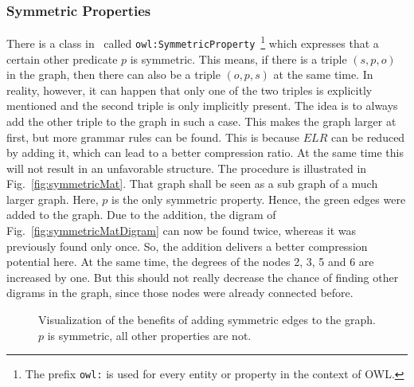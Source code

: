 \subsubsection{Symmetric Properties}


There is a class in~\cite{owl} called {\tt owl:SymmetricProperty}~\footnote{The prefix {\tt owl:} is used for every entity or property in the context of OWL.} which expresses that a certain other predicate $p$ is symmetric. This means, if there is a triple $(s,p,o)$ in the graph, then there can also be a triple $(o,p,s)$ at the same time. In reality, however, it can happen that only one of the two triples is explicitly mentioned and the second triple is only implicitly present. The idea is to always add the other triple to the graph in such a case. This makes the graph larger at first, but more grammar rules can be found. This is because $ELR$ can be reduced by adding it, which can lead to a better compression ratio. At the same time this will not result in an unfavorable structure. The procedure is illustrated in Fig.~\ref{fig:symmetricMat}. That graph shall be seen as a sub graph of a much larger graph. Here, $p$ is the only symmetric property. Hence, the green edges were added to the graph. Due to the addition, the digram of Fig.~\ref{fig:symmetricMatDigram} can now be found twice, whereas it was previously found only once. So, the addition delivers a better compression potential here. At the same time, the degrees of  the nodes 2, 3, 5 and 6 are increased by one. But this should not really decrease the chance of finding other digrams in the graph, since those nodes were already connected before.


\begin{figure}[h]
	\centering
	\hfill
	\caption{Visualization of the benefits of adding symmetric edges to the graph. $p$ is symmetric, all other properties are not.}
	\label{}
\end{figure}


